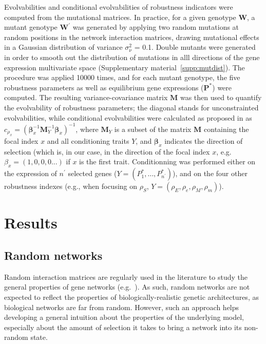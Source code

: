 \documentclass[10pt,a4paper]{article}
\newcommand{\stability}{{\rho_S}}
\newcommand{\earlyenv}{{\rho_E}}
\newcommand{\lateenv}{{\rho_e}}
\newcommand{\earlymut}{{\rho_M}}
\newcommand{\latemut}{{\rho_m}}
\newcommand{\SupMat}{Supplementary material~}
\begin{document}
Evolvabilities and conditional evolvabilities of robustness indicators were computed from the mutational matrices. In practice, for a given genotype $\bm W$, a mutant genotype $\bm W^\prime$ was generated by applying two random mutations at random positions in the network interaction matrices, drawing mutational effects in a Gaussian distribution of variance $\sigma_\nu^2$ = 0.1. Double mutants were generated in order to smooth out the distribution of mutations in alll directions of the gene expression multivariate space (\SupMat \ref{supp:mutdist}). The procedure was applied 10000 times, and for each mutant genotype, the five robustness parameters as well as equilibrium gene expressions ($\bm P^*$) were computed. The resulting variance-covariance matrix $\bm M$ was then used to quantify the evolvability of robustness parameters; the diagonal stands for unconstrainted evolvabilities, while conditional evolvabilities were calculated as proposed in \citet{HH08} as $c_{\rho_x} = (\bm \beta_x^{-1} \bm M_Y^{-1} \bm \beta_x)^{-1}$, where $\bm M_Y$ is a subset of the matrix $\bm M$ containing the focal index $x$ and all conditioning traits $Y$, and $\bm \beta_x$ indicates the direction of selection (which is, in our case, in the direction of the focal index $x$, e.g. $\beta_x = (1,0,0,0...)$ if $x$ is the first trait. Conditionning was performed either on the expression of $n^\prime$ selected genes ($Y = (P_1^*, \dots, P_{n^\prime}^*)$), and on the four other robustness indexes (e.g., when focusing on $\stability$, $Y = (\earlyenv, \lateenv, \earlymut, \latemut)$). 

\section{Results}

\subsection{Random networks}

Random interaction matrices are regularly used in the literature to study the general properties of gene networks (e.g.\ \cite{CTH11,PBF12}). As such, random networks are not expected to reflect the properties of biologically-realistic genetic architectures, as biological networks are far from random. However, such an approach helps developing a general intuition about the properties of the underlying model, especially about the amount of selection it takes to bring a network into its non-random state. 
\end{document}
